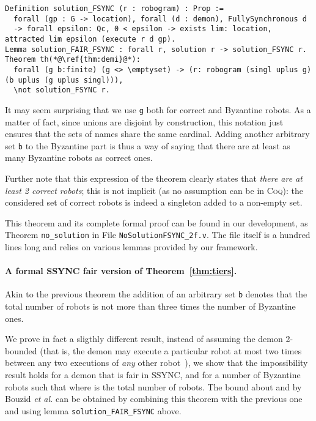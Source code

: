 \documentclass[11pt,a4]{llncs}
\newcommand{\x}{\xspace}
\newcommand{\coq}{\textsc{Coq}\x}
\begin{document}
\begin{lstlisting}
Definition solution_FSYNC (r : robogram) : Prop := 
  forall (gp : G -> location), forall (d : demon), FullySynchronous d 
  -> forall epsilon: Qc, 0 < epsilon -> exists lim: location, attracted lim epsilon (execute r d gp).
Lemma solution_FAIR_FSYNC : forall r, solution r -> solution_FSYNC r.
Theorem th(*@\ref{thm:demi}@*):
  forall (g b:finite) (g <> \emptyset) -> (r: robogram (singl uplus g) (b uplus (g uplus singl))), 
  \not solution_FSYNC r.
\end{lstlisting}
It may seem surprising that we use \texttt{g} both for correct and
Byzantine robots. As a matter of fact, since unions are disjoint by
construction, this notation just ensures that the sets of names share
the same cardinal. Adding another arbitrary set \texttt{b} to the
Byzantine part is thus a way of saying that there are at least as many
Byzantine robots as correct ones.

Further note that this expression of the theorem clearly
states that \emph{there are at least 2 correct robots}; this is not
implicit (as no assumption can be in \coq): the considered set of
correct robots is indeed a singleton added to a
non-empty set.

This theorem and its complete formal proof can be found in our
development, as Theorem \lstinline!no_solution! in File
\lstinline!NoSolutionFSYNC_2f.v!. The file itself is a hundred lines long
and relies on various lemmas provided by our
framework.


\paragraph{A formal SSYNC fair version of Theorem~\ref{thm:tiers}.}\label{sec:formal_tiers}

Akin to the previous
theorem the addition of an arbitrary
set \texttt{b} denotes that the total number of robots is not more
than three times the number of Byzantine ones.

We prove in fact a sligthly different result, instead of assuming
the demon 2-bounded (that is, the demon may execute a particular robot at
most two times between any two executions of \emph{any} other
robot~\cite{DT11r}), we show that the impossibility result holds for a
demon that is fair in SSYNC,
and for a number  of
Byzantine robots such that  where  is the total
number of robots. The bound about  and  by Bouzid \emph{et al.} 
can be obtained by
combining this theorem with the previous one and using lemma
\texttt{\small solution\_FAIR\_FSYNC} above.
\end{document}
